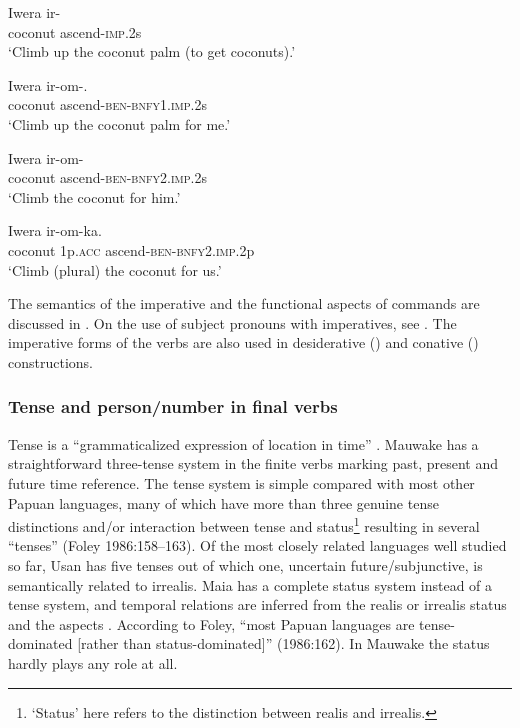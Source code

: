 \ea%
\label{ex:x432}
\gll Iwera ir- \\
coconut ascend-\textsc{imp}.2s\\
\glt`Climb up the coconut palm (to get coconuts).'
\z

\ea%
\label{ex:x431}
\gll Iwera ir-om-. \\
coconut ascend-\textsc{ben}-\textsc{bnfy}1.\textsc{imp}.2s\\
\glt`Climb up the coconut palm for me.'
\z

\ea%
\label{ex:x232}
\gll Iwera ir-om- \\
coconut ascend-\textsc{ben}-\textsc{bnfy}2.\textsc{imp}.2s \\
\glt`Climb the coconut for him.'
\z

\ea%
\label{ex:x233}
\gll Iwera  ir-om-ka. \\
coconut 1p.\textsc{acc} ascend-\textsc{ben}-\textsc{bnfy}2.\textsc{imp}.2p \\
\glt`Climb (plural) the coconut for us.'
\z

The semantics of the imperative and the functional aspects of commands are discussed in . On the use of subject pronouns with imperatives, see . The imperative forms of the verbs are also used in desiderative () and conative () constructions. 

\subsubsection[Tense and person/number in final verbs]{Tense and person/number in final verbs}
{}
Tense is a ``{grammaticalized expression of location in time}'' \citep[9]{Comrie1985}. Mauwake has a straightforward three-tense system in the finite verbs marking past, present and future time reference. The tense system is simple compared with most other Papuan languages, many of which have more than three genuine tense distinctions and/or interaction between tense and status\footnote{`Status' here refers to the distinction between realis and irrealis.} resulting in several ``tenses'' ({Foley 1986}:158--163). Of the most closely related languages well studied so far, Usan has five tenses \citep[98]{Reesink1987} out of which one, uncertain future/subjunctive, is semantically related to irrealis. Maia has a complete status system instead of a tense system, and temporal relations are inferred from the realis or irrealis status and the aspects \citep[55]{Hardin2002}. According to {Foley}, {``most Papuan languages are tense-dominated [rather than status-dominated]''} (1986:162). In Mauwake the status hardly plays any role at all.

